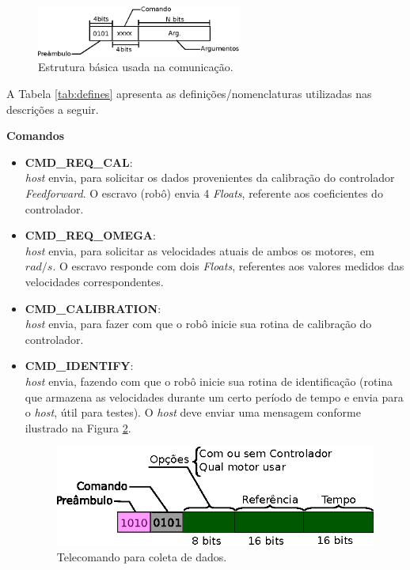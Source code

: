 \begin{figure}[H]
    \centering
    \includegraphics[width=0.6\textwidth]{figuras/ilustracoes/ilustracao_frame_generico.eps}
    \caption{Estrutura básica usada na comunicação.}
    \label{fig:frame_generico}
\end{figure}



A Tabela \ref{tab:defines} apresenta as definições/nomenclaturas utilizadas nas descrições a seguir.

\textbf{Comandos}
\begin{itemize}
    \item \textbf{CMD\_REQ\_CAL}:\\
        \textit{host} envia, para solicitar os dados provenientes da calibração do controlador \textit{Feedforward}. O escravo (robô) envia 4 \emph{Floats}, referente aos coeficientes do controlador.
    \item \textbf{CMD\_REQ\_OMEGA}:\\
        \textit{host} envia, para solicitar as velocidades atuais de ambos os motores, em $rad/s$. O escravo responde com dois \emph{Floats}, referentes aos valores medidos das velocidades correspondentes.
    \item \textbf{CMD\_CALIBRATION}:\\
        \textit{host} envia, para fazer com que o robô inicie sua rotina de calibração do controlador.
    \item \textbf{CMD\_IDENTIFY}:\\
        \textit{host} envia, fazendo com que o robô inicie sua rotina de identificação (rotina que armazena as velocidades durante um certo período de tempo e envia para o \emph{host}, útil para testes). O \textit{host} deve enviar uma mensagem conforme ilustrado na Figura \ref{fig:comando_identify}.\\
        
        \begin{figure}[H]
            \centering
            \includegraphics[width=\textwidth]{figuras/ilustracoes/ilustracao_comando_coleta_de_dados.eps}
            \caption{Telecomando para coleta de dados.}
            \label{fig:comando_identify}
        \end{figure}
        

\end{itemize}
